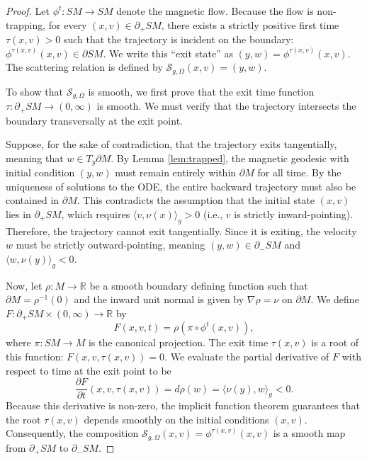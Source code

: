\documentclass[12pt]{amsart}
\numberwithin{equation}{section}
\begin{document}
\begin{proof}
Let $\phi^t: SM \to SM$ denote the magnetic flow. Because the flow is non-trapping, for every $(x,v) \in \partial_+ SM$, there exists a strictly positive first time $\tau(x,v) > 0$ such that the trajectory is incident on the boundary: $\phi^{\tau(x,v)}(x,v) \in \partial SM$. We write this ``exit state'' as $(y,w) = \phi^{\tau(x,v)}(x,v)$. The scattering relation is defined by $\mathcal{S}_{g,\Omega}(x,v) = (y,w)$.

To show that $\mathcal{S}_{g,\Omega}$ is smooth, we first prove that the exit time function $\tau: \partial_+ SM \to (0,\infty)$ is smooth. We must verify that the trajectory intersects the boundary transversally at the exit point.

Suppose, for the sake of contradiction, that the trajectory exits tangentially, meaning that $w \in T_y \partial M$. By Lemma \ref{lem:trapped}, the magnetic geodesic with initial condition $(y,w)$ must remain entirely within $\partial M$ for all time. By the uniqueness of solutions to the ODE, the entire backward trajectory must also be contained in $\partial M$. This contradicts the assumption that the initial state $(x,v)$ lies in $\partial_+ SM$, which requires $\langle v, \nu(x) \rangle_g > 0$ (i.e., $v$ is strictly inward-pointing). Therefore, the trajectory cannot exit tangentially. Since it is exiting, the velocity $w$ must be strictly outward-pointing, meaning $(y,w) \in \partial_- SM$ and $\langle w, \nu(y) \rangle_g < 0$.

Now, let $\rho: M \to \mathbb{R}$ be a smooth boundary defining function such that $\partial M = \rho^{-1}(0)$ and the inward unit normal is given by $\nabla \rho = \nu$ on $\partial M$. We define $F: \partial_+ SM \times (0,\infty) \to \mathbb{R}$ by
\begin{equation}
    F(x,v,t) = \rho(\pi \circ \phi^t(x,v)) ,
\end{equation}
where $\pi: SM \to M$ is the canonical projection. The exit time $\tau(x,v)$ is a root of this function: $F(x,v,\tau(x,v)) = 0$. We evaluate the partial derivative of $F$ with respect to time at the exit point to be
\begin{equation}
    \frac{\partial F}{\partial t}(x,v,\tau(x,v)) = d\rho(w) = \langle \nu(y), w \rangle_g < 0.
\end{equation}
Because this derivative is non-zero, the implicit function theorem guarantees that the root $\tau(x,v)$ depends smoothly on the initial conditions $(x,v)$. Consequently, the composition $\mathcal{S}_{g,\Omega}(x,v) = \phi^{\tau(x,v)}(x,v)$ is a smooth map from $\partial_+ SM$ to $\partial_- SM$.


\end{proof}
\end{document}
